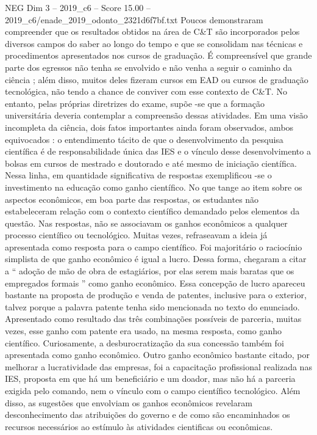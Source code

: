 \begin{textsample}{NEG Dim 3 – 2019\_c6 – Score 15.00 – 2019\_c6/enade\_2019\_odonto\_2321d6f7bf.txt}
Poucos demonstraram compreender que os resultados obtidos na área de C\&T são incorporados pelos diversos campos do saber ao longo do tempo e que se consolidam nas técnicas e procedimentos apresentados nos cursos de graduação.
É compreensível que grande parte dos egressos não tenha se envolvido e não venha a seguir o caminho da ciência ; além disso, muitos deles fizeram cursos em EAD ou cursos de graduação tecnológica, não tendo a chance de conviver com esse contexto de C\&T.
No entanto, pelas próprias diretrizes do exame, supõe -se que a formação universitária deveria contemplar a compreensão dessas atividades.
Em uma visão incompleta da ciência, dois fatos importantes ainda foram observados, ambos equivocados : o entendimento tácito de que o desenvolvimento da pesquisa científica é de responsabilidade única das IES e o vínculo desse desenvolvimento a bolsas em cursos de mestrado e doutorado e até mesmo de iniciação científica.
Nessa linha, em quantidade significativa de respostas exemplificou -se o investimento na educação como ganho científico.
No que tange ao item sobre os aspectos econômicos, em boa parte das respostas, os estudantes não estabeleceram relação com o contexto científico demandado pelos elementos da questão.
Nas respostas, não se associavam os ganhos econômicos a qualquer processo científico ou tecnológico.
Muitas vezes, refraseavam a ideia já apresentada como resposta para o campo científico.
Foi majoritário o raciocínio simplista de que ganho econômico é igual a lucro.
Dessa forma, chegaram a citar a “ adoção de mão de obra de estagiários, por elas serem mais baratas que os empregados formais ” como ganho econômico.
Essa concepção de lucro apareceu bastante na proposta de produção e venda de patentes, inclusive para o exterior, talvez porque a palavra patente tenha sido mencionada no texto do enunciado.
Apresentado como resultado das três combinações possíveis de parceria, muitas vezes, esse ganho com patente era usado, na mesma resposta, como ganho científico.
Curiosamente, a desburocratização da sua concessão também foi apresentada como ganho econômico.
Outro ganho econômico bastante citado, por melhorar a lucratividade das empresas, foi a capacitação profissional realizada nas IES, proposta em que há um beneficiário e um doador, mas não há a parceria exigida pelo comando, nem o vínculo com o campo científico tecnológico.
Além disso, as sugestões que envolviam os ganhos econômicos revelaram desconhecimento das atribuições do governo e de como são encaminhados os recursos necessários ao estímulo às atividades cientificas ou econômicas.

\end{textsample}
